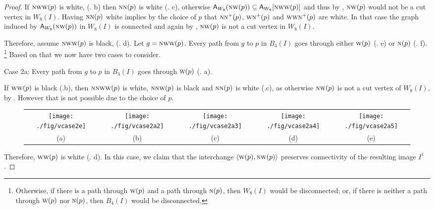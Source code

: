 \documentclass[lotsofwhite,charterfonts]{patmorin}
\newcommand{\N}{\textsc{n}}
\newcommand{\W}{\textsc{w}}
\newcommand{\NW}{\textsc{nw}}
\newcommand{\ic}[2]{\langle #1,#2 \rangle}
\newcommand{\A}[2]{\ensuremath{\protect\textup{\textsf{A}}_{#2}(#1)}}
\newcommand{\AC}[2]{\ensuremath{\protect\textup{\textsf{A}}_{#2}[#1]}}
\newcommand{\se}{\ensuremath{\subseteq}}
\begin{document}
\begin{proof}
If $\NW\W(p)$ is white, (. b) then $\N\N(p)$ is white (. c), otherwise $\A{\NW(p)}{W_8}\se \AC{\NW\W(p)}{W_8}$ and thus by , $\NW(p)$ would not be a cut vertex in $W_8(I)$. Having $\N\N(p)$ white implies by the choice of $p$ that $\N\N^+(p)$, $\W\N^+(p)$ and $\W\W\N^+(p)$ are white. In that case the graph induced by \A{\NW(p)}{W_8} in $W_8(I)$ is connected and again by , $\NW(p)$ is not a cut vertex in $W_8(I)$.


Therefore, assume $\NW\W(p)$ is black, (. d). Let $g=\NW\W(p)$. Every path from $g$ to $p$ in $B_4(I)$ goes through  either $\W(p)$  (. e) or $\N(p)$  (. f). \footnote{Otherwise, if there is a path through $\W(p)$ and a path through $\N(p)$, then $W_8(I)$ would be disconnected; or, if there is neither a path through $\W(p)$ nor $\N(p)$, then $B_4(I)$ would be disconnected.} Based on that we now have two cases to consider.

\noindent Case 2a: Every path from $g$ to $p$ in $B_4(I)$ goes through $\W(p)$ (. a). 

If $\W\W(p)$ is black (.b), then $\N\N\W\W(p)$ is white, $\N\N\W(p)$ is black and  $\N\N(p)$ is white (.c), as otherwise $\NW(p)$ is not a cut vertex of $W_8(I)$, by . However that is not possible due to the choice of $p$.

\begin{figure}[htbp]
\begin{center}
\begin{tabular}{ccccc}
\texttt{[image: ./fig/vcase2e]} & 
\texttt{[image: ./fig/vcase2a2]} & 
\texttt{[image: ./fig/vcase2a3]} & 
\texttt{[image: ./fig/vcase2a4]} &
\texttt{[image: ./fig/vcase2a5]}
\\
(a) & (b) & (c) & (d) & (e)
\end{tabular}
\end{center}
\caption{}
\end{figure}

Therefore,  $\W\W(p)$ is white (. d). In this case, we claim that the interchange $\ic{\W(p)}{\NW(p)}$ preserves connectivity of the resulting image $I^1$. 



\end{proof}
\end{document}
